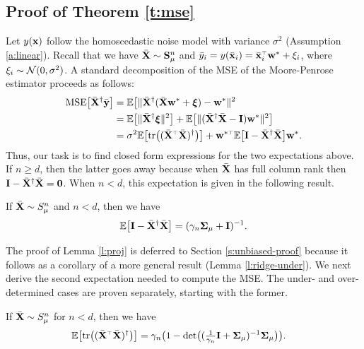 \documentclass[11pt]{article}
\begin{document}
\subsection{Proof of Theorem \ref{t:mse}}
\label{s:mse-proof}
Let $y(\mathbf x)$ follow the homoscedastic noise model with variance $\sigma^2$
(Assumption \ref{a:linear}). Recall that we have
${\bar{\mathbf X}}\sim\mathbf{S}_\mu^n$ and $\yb_i=y(\xbb_i)=\xbb_i^\top\w^*+\xi_i$, where
$\xi_i\sim\mathcal{N}(0,\sigma^2)$. A standard decomposition of
the MSE of the Moore-Penrose estimator proceeds as follows:
\begin{align*}
  \MSE{\Xb^\dagger\ybb}
  &= \E\big[\|\Xb^\dagger(\Xb\w^*+\xib)-\w^*\|^2\\
  &=\E\big[\|\Xb^\dagger\xib\|^2\big] +
    \E\big[\|(\Xb^\dagger\Xb-\I)\w^*\|^2\big]\\
  &=\sigma^2\E\big[\tr\big((\Xb^\top\Xb)^{\dagger}\big)\big] +
    \w^{*\top}\E\big[\I-\Xb^\dagger\Xb\big]\w^*.
\end{align*}
Thus, our task is to find closed form expressions for the two
expectations above. If $n\geq d$, then the latter goes away because
when ${\bar{\mathbf X}}$ has full column rank then $\mathbf I-{\bar{\mathbf X}}^\dagger{\bar{\mathbf X}}=\mathbf 0$. When
$n<d$, this expectation is given in the following result. %
\begin{lemma}\label{l:proj}
If  ${\bar{\mathbf X}}\sim S_\mu^n$ and $n<d$, then we have
\[\mathbb E\big[\mathbf I-{\bar{\mathbf X}}^\dagger{\bar{\mathbf X}}\big] = (\gamma_n\mathbf{\Sigma}_\mu+\mathbf I)^{-1}.\]
\end{lemma}
The proof of Lemma \ref{l:proj} is deferred to Section
\ref{s:unbiased-proof} because it follows as a corollary of a more
general result (Lemma \ref{l:ridge-under}). We next derive the second
expectation needed to compute the MSE. The under- and over-determined
cases are proven separately, starting with the former.
\begin{lemma}\label{l:sqinv-under}
If  ${\bar{\mathbf X}}\sim S_\mu^n$ for $n<d$, then we have
\begin{align*}
    \E\big[\tr\big((\Xb^\top\Xb)^{\dagger}\big)\big]
    &={\gamma_n}\big(1- \det\!\big((\tfrac1{\gamma_n}\I+\Sigmab_\mu)^{-1}\Sigmab_\mu\big)\big).
\end{align*}
\end{lemma}
\end{document}
